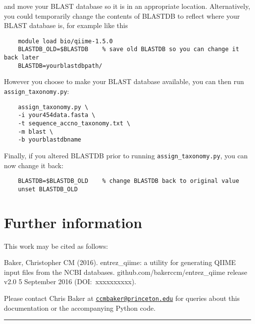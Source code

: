 \documentclass[11pt]{amsart}
\begin{document}
and move your BLAST database so it is in an appropriate location. Alternatively, you could temporarily change the contents of BLASTDB to reflect where your BLAST database is, for example like this

\begin{verbatim}
    module load bio/qiime-1.5.0
    BLASTDB_OLD=$BLASTDB    % save old BLASTDB so you can change it back later
    BLASTDB=yourblastdbpath/
\end{verbatim}

However you choose to make your BLAST database available, you can then run \verb|assign_taxonomy.py|:

\begin{verbatim}
    assign_taxonomy.py \
    -i your454data.fasta \
    -t sequence_accno_taxonomy.txt \
    -m blast \
    -b yourblastdbname
\end{verbatim}

Finally, if you altered BLASTDB prior to running \verb|assign_taxonomy.py|, you can now change it back:

\begin{verbatim}
    BLASTDB=$BLASTDB_OLD    % change BLASTDB back to original value
    unset BLASTDB_OLD
\end{verbatim}

\section{Further information}
\label{section:misc}

This work may be cited as follows:

Baker, Christopher CM (2016). entrez\_qiime: a utility for generating QIIME input files from the NCBI databases. github.com/bakerccm/entrez\_qiime release v2.0 5 September 2016 (DOI:~xxxxxxxxxx).

Please contact Chris Baker at \href{mailto:ccmbaker@princeton.edu}{\tt ccmbaker@princeton.edu} for queries about this documentation or the accompanying Python code.

\vspace{18pt}
\hrule
\end{document}
